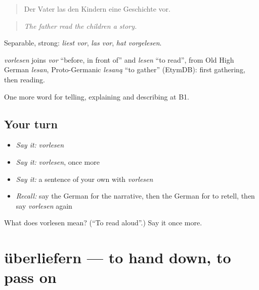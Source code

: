 \begin{quote}
Der Vater las den Kindern eine Geschichte vor.
\end{quote}

\begin{quote}
\emph{The father read the children a story.}
\end{quote}

Separable, strong: \emph{liest vor}, \emph{las vor}, \emph{hat vorgelesen}.

\begin{cousinweb}
\emph{vorlesen} joins \emph{vor} \textquotedblleft{}before, in front of\textquotedblright{} and \emph{lesen} \textquotedblleft{}to read\textquotedblright{}, from Old High German \emph{lesan}, Proto-Germanic \emph{lesaną} \textquotedblleft{}to gather\textquotedblright{} (EtymDB): first gathering, then reading.
\end{cousinweb}

\begin{grammarlens}[title={What you've built}]
One more word for telling, explaining and describing at B1.
\end{grammarlens}

\subsection*{Your turn}
\begin{itemize}
\raggedright
  \item \emph{Say it:} \emph{vorlesen}
  \item \emph{Say it:} \emph{vorlesen}, once more
  \item \emph{Say it:} a sentence of your own with \emph{vorlesen}
  \item \emph{Recall:} say the German for the narrative, then the German for to retell, then say \emph{vorlesen} again
\end{itemize}

\begin{tcolorbox}[breakable,colback=teal!4,colframe=teal!35!black,title={Before you move on}]
What does vorlesen mean? (\textquotedblleft{}To read aloud\textquotedblright{}.) Say it once more.
\end{tcolorbox}
\section[überliefern]{überliefern — to hand down, to pass on}

\label{lesson:GE-C317-ueberliefern}



